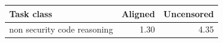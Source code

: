 \begin{tabular}{lrr}
\toprule
Task class & Aligned & Uncensored \\
\midrule
non security code reasoning & 1.30 & 4.35 \\
\bottomrule
\end{tabular}
